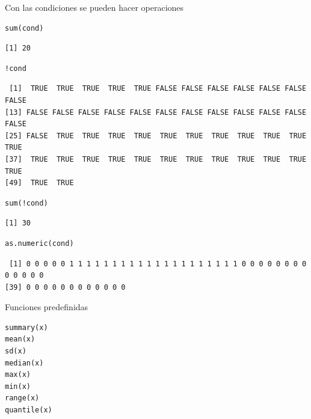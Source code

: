 \documentclass[xcolor={usenames,svgnames,dvipsnames}]{beamer}
\begin{document}
\begin{frame}[fragile,label=sec-2-1-12]{Con las condiciones se pueden hacer operaciones}
 \lstset{language=R,label= ,caption= ,numbers=none}
\begin{lstlisting}
sum(cond)
\end{lstlisting}

\begin{verbatim}
[1] 20
\end{verbatim}

\lstset{language=R,label= ,caption= ,numbers=none}
\begin{lstlisting}
!cond
\end{lstlisting}

\begin{verbatim}
 [1]  TRUE  TRUE  TRUE  TRUE  TRUE FALSE FALSE FALSE FALSE FALSE FALSE FALSE
[13] FALSE FALSE FALSE FALSE FALSE FALSE FALSE FALSE FALSE FALSE FALSE FALSE
[25] FALSE  TRUE  TRUE  TRUE  TRUE  TRUE  TRUE  TRUE  TRUE  TRUE  TRUE  TRUE
[37]  TRUE  TRUE  TRUE  TRUE  TRUE  TRUE  TRUE  TRUE  TRUE  TRUE  TRUE  TRUE
[49]  TRUE  TRUE
\end{verbatim}

\lstset{language=R,label= ,caption= ,numbers=none}
\begin{lstlisting}
sum(!cond)
\end{lstlisting}

\begin{verbatim}
[1] 30
\end{verbatim}

\lstset{language=R,label= ,caption= ,numbers=none}
\begin{lstlisting}
as.numeric(cond)
\end{lstlisting}

\begin{verbatim}
 [1] 0 0 0 0 0 1 1 1 1 1 1 1 1 1 1 1 1 1 1 1 1 1 1 1 1 0 0 0 0 0 0 0 0 0 0 0 0 0
[39] 0 0 0 0 0 0 0 0 0 0 0 0
\end{verbatim}
\end{frame}



\begin{frame}[fragile,label=sec-2-1-13]{Funciones predefinidas}
 \lstset{language=R,label= ,caption= ,numbers=none}
\begin{lstlisting}
summary(x)
mean(x)
sd(x)
median(x)
max(x)
min(x)
range(x)
quantile(x)
\end{lstlisting}
\end{frame}
\end{document}

